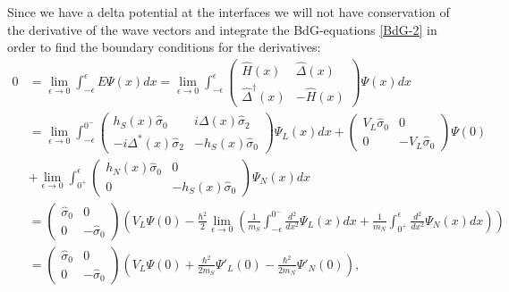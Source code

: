 Since we have a delta potential at the interfaces we will not have conservation of the derivative of the wave vectors and integrate the BdG-equations \eqref{BdG-2} in order to find the boundary conditions for the derivatives:
\begin{equation*}
\begin{split}
    0 &= \lim_{\epsilon \rightarrow 0} \int_{-\epsilon}^{\epsilon} E\Psi(x) dx = \lim_{\epsilon \rightarrow 0} \int_{-\epsilon}^{\epsilon}
    \begin{pmatrix}
    \hat{H}(x) & \hat{\Delta}(x) \\
    \hat{\Delta}^{\dagger}(x) & -\hat{H}(x)
    \end{pmatrix}
    \Psi(x)dx
    \\
    &=\lim_{\epsilon \rightarrow 0} \int_{-\epsilon}^{0^-}
    \begin{pmatrix}
    h_S(x)\hat{\sigma}_0 & i\Delta(x)\hat{\sigma}_2 \\
    -i\Delta^*(x)\hat{\sigma}_2 & -h_S(x)\hat{\sigma}_0
    \end{pmatrix}
    \Psi_{L}(x)dx
    +
    \begin{pmatrix}
    V_L\hat{\sigma}_0 & 0\\
    0 & -V_L\hat{\sigma}_0
    \end{pmatrix}
    \Psi(0)
    \\
    &+\lim_{\epsilon \rightarrow 0} \int_{0^+}^{\epsilon}
    \begin{pmatrix}
    h_N(x)\hat{\sigma}_0 & 0 \\
    0 & -h_S(x)\hat{\sigma}_0
    \end{pmatrix}
    \Psi_{N}(x)dx\\
    &=
    \begin{pmatrix}
    \hat{\sigma}_0 & 0\\
    0 & -\hat{\sigma}_0
    \end{pmatrix}
    \left(
    V_L\Psi(0)
    -\frac{\hbar^2}{2}
    \lim_{\epsilon \rightarrow 0}
    \left( \frac{1}{m_S}\int_{-\epsilon}^{0^-} 
    \frac{d^2}{dx^2} \Psi_L(x) dx
    + \frac{1}{m_N}\int_{0^+}^{\epsilon} 
    \frac{d^2}{dx^2} \Psi_N(x) dx \right)
    \right)\\
    &=
    \begin{pmatrix}
    \hat{\sigma}_0 & 0\\
    0 & -\hat{\sigma}_0
    \end{pmatrix}
    \left(
    V_L\Psi(0) +
    \frac{\hbar^2}{2m_S}
    \Psi'_L(0)
    -  \frac{\hbar^2}{2m_N}
    \Psi'_N(0) 
    \right),
\end{split}
\end{equation*}
